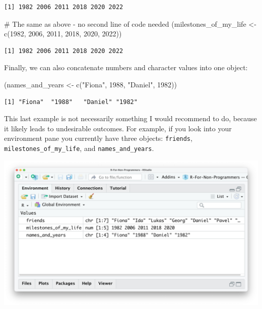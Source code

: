 \documentclass[
  letterpaper,
]{krantz}
\makeatletter
\newenvironment{Shaded}{\begin{snugshade}}{\end{snugshade}}
\newcommand{\CommentTok}[1]{\textcolor[rgb]{0.37,0.37,0.37}{#1}}
\newcommand{\DecValTok}[1]{\textcolor[rgb]{0.68,0.00,0.00}{#1}}
\newcommand{\FunctionTok}[1]{\textcolor[rgb]{0.28,0.35,0.67}{#1}}
\newcommand{\NormalTok}[1]{\textcolor[rgb]{0.00,0.23,0.31}{#1}}
\newcommand{\OtherTok}[1]{\textcolor[rgb]{0.00,0.23,0.31}{#1}}
\newcommand{\StringTok}[1]{\textcolor[rgb]{0.13,0.47,0.30}{#1}}
\newenvironment{kframe}{%
\medskip{}
\setlength{\fboxsep}{.8em}
 \def\at@end@of@kframe{}%
 \ifinner\ifhmode%
  \def\at@end@of@kframe{\end{minipage}}%
  \begin{minipage}{\columnwidth}%
 \fi\fi%
 \def\FrameCommand##1{\hskip\@totalleftmargin \hskip-\fboxsep
 \colorbox{shadecolor}{##1}\hskip-\fboxsep
     \hskip-\linewidth \hskip-\@totalleftmargin \hskip\columnwidth}%
 \MakeFramed {\advance\hsize-\width
   \@totalleftmargin\z@ \linewidth\hsize
   \@setminipage}}%
 {\par\unskip\endMakeFramed%
 \at@end@of@kframe}
\renewenvironment{Shaded}{\begin{kframe}}{\end{kframe}}
\makeatother
\begin{document}
\begin{verbatim}
[1] 1982 2006 2011 2018 2020 2022
\end{verbatim}

\begin{Shaded}
\begin{Highlighting}[]
\CommentTok{\# The same as above {-} no second line of code needed}
\NormalTok{(milestones\_of\_my\_life }\OtherTok{\textless{}{-}} \FunctionTok{c}\NormalTok{(}\DecValTok{1982}\NormalTok{, }\DecValTok{2006}\NormalTok{, }\DecValTok{2011}\NormalTok{, }\DecValTok{2018}\NormalTok{, }\DecValTok{2020}\NormalTok{, }\DecValTok{2022}\NormalTok{))}
\end{Highlighting}
\end{Shaded}

\begin{verbatim}
[1] 1982 2006 2011 2018 2020 2022
\end{verbatim}

Finally, we can also concatenate numbers and character values into one
object:

\begin{Shaded}
\begin{Highlighting}[]
\NormalTok{(names\_and\_years }\OtherTok{\textless{}{-}} \FunctionTok{c}\NormalTok{(}\StringTok{"Fiona"}\NormalTok{, }\DecValTok{1988}\NormalTok{, }\StringTok{"Daniel"}\NormalTok{, }\DecValTok{1982}\NormalTok{))}
\end{Highlighting}
\end{Shaded}

\begin{verbatim}
[1] "Fiona"  "1988"   "Daniel" "1982"  
\end{verbatim}

This last example is not necessarily something I would recommend to do,
because it likely leads to undesirable outcomes. For example, if you
look into your environment pane you currently have three objects:
\texttt{friends}, \texttt{milestones\_of\_my\_life}, and
\texttt{names\_and\_years}.

\includegraphics{images/chapter_05_img/01_basic_computation_environment_objects.png}
\end{document}

